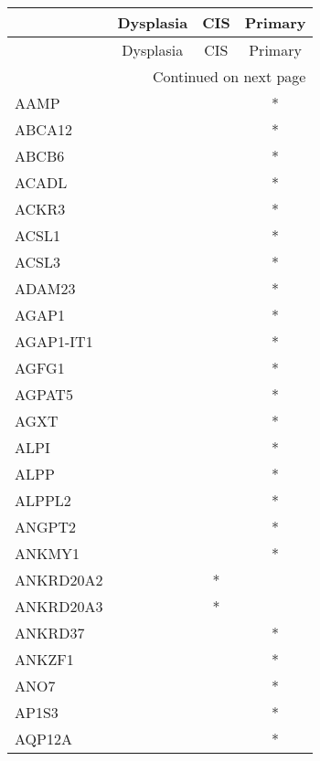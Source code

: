 \begin{longtable}{lccc}
\toprule
{} & Dysplasia & CIS & Primary \\
\midrule
\endfirsthead

\toprule
{} & Dysplasia & CIS & Primary \\
\midrule
\endhead
\midrule
\multicolumn{4}{r}{{Continued on next page}} \\
\midrule
\endfoot

\bottomrule
\endlastfoot
AAMP           &           &     &       * \\
ABCA12         &           &     &       * \\
ABCB6          &           &     &       * \\
ACADL          &           &     &       * \\
ACKR3          &           &     &       * \\
ACSL1          &           &     &       * \\
ACSL3          &           &     &       * \\
ADAM23         &           &     &       * \\
AGAP1          &           &     &       * \\
AGAP1-IT1      &           &     &       * \\
AGFG1          &           &     &       * \\
AGPAT5         &           &     &       * \\
AGXT           &           &     &       * \\
ALPI           &           &     &       * \\
ALPP           &           &     &       * \\
ALPPL2         &           &     &       * \\
ANGPT2         &           &     &       * \\
ANKMY1         &           &     &       * \\
ANKRD20A2      &           &   * &         \\
ANKRD20A3      &           &   * &         \\
ANKRD37        &           &     &       * \\
ANKZF1         &           &     &       * \\
ANO7           &           &     &       * \\
AP1S3          &           &     &       * \\
AQP12A         &           &     &       * \\

\end{longtable}
